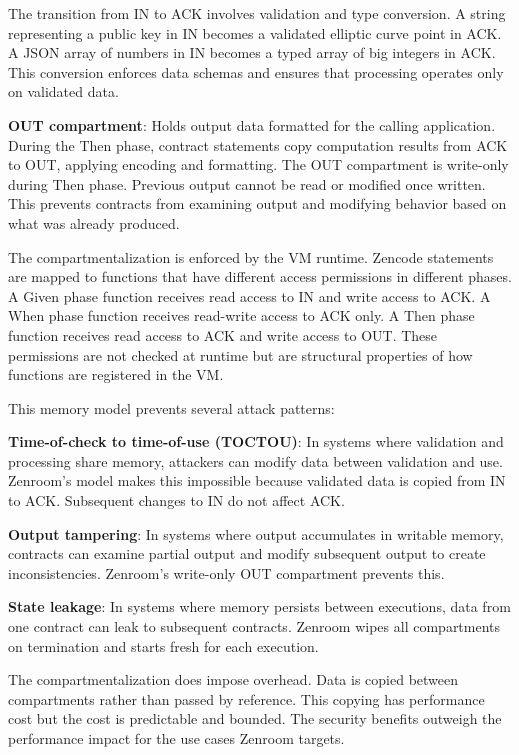 The transition from IN to ACK involves validation and type
conversion. A string representing a public key in IN becomes a
validated elliptic curve point in ACK. A JSON array of numbers in IN
becomes a typed array of big integers in ACK. This conversion enforces
data schemas and ensures that processing operates only on validated
data.

\textbf{OUT compartment}: Holds output data formatted for the calling
application. During the Then phase, contract statements copy
computation results from ACK to OUT, applying encoding and
formatting. The OUT compartment is write-only during Then
phase. Previous output cannot be read or modified once written. This
prevents contracts from examining output and modifying behavior based
on what was already produced.

The compartmentalization is enforced by the VM runtime. Zencode
statements are mapped to functions that have different access
permissions in different phases. A Given phase function receives read
access to IN and write access to ACK. A When phase function receives
read-write access to ACK only. A Then phase function receives read
access to ACK and write access to OUT. These permissions are not
checked at runtime but are structural properties of how functions are
registered in the VM.

This memory model prevents several attack patterns:

\textbf{Time-of-check to time-of-use (TOCTOU)}: In systems where
validation and processing share memory, attackers can modify data
between validation and use. Zenroom's model makes this impossible
because validated data is copied from IN to ACK. Subsequent changes to
IN do not affect ACK.

\textbf{Output tampering}: In systems where output accumulates in
writable memory, contracts can examine partial output and modify
subsequent output to create inconsistencies. Zenroom's write-only OUT
compartment prevents this.

\textbf{State leakage}: In systems where memory persists between
executions, data from one contract can leak to subsequent
contracts. Zenroom wipes all compartments on termination and starts
fresh for each execution.

The compartmentalization does impose overhead. Data is copied between
compartments rather than passed by reference. This copying has
performance cost but the cost is predictable and bounded. The security
benefits outweigh the performance impact for the use cases Zenroom
targets.

